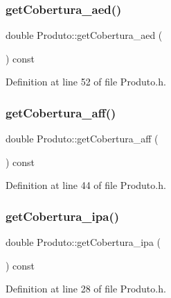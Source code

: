 \subsubsection{\texorpdfstring{get\+Cobertura\+\_\+aed()}{getCobertura\_aed()}}
{\footnotesize\ttfamily double Produto\+::get\+Cobertura\+\_\+aed (\begin{DoxyParamCaption}{ }\end{DoxyParamCaption}) const\hspace{0.3cm}{\ttfamily [inline]}}



Definition at line 52 of file Produto.\+h.

\hypertarget{class_produto_a9acf053a9b38ac53acca9e5dc33fa772}{}\label{class_produto_a9acf053a9b38ac53acca9e5dc33fa772} 
\subsubsection{\texorpdfstring{get\+Cobertura\+\_\+aff()}{getCobertura\_aff()}}
{\footnotesize\ttfamily double Produto\+::get\+Cobertura\+\_\+aff (\begin{DoxyParamCaption}{ }\end{DoxyParamCaption}) const\hspace{0.3cm}{\ttfamily [inline]}}



Definition at line 44 of file Produto.\+h.

\hypertarget{class_produto_a7fb03a7eb1d2a682ee87909217c3fb10}{}\label{class_produto_a7fb03a7eb1d2a682ee87909217c3fb10} 
\subsubsection{\texorpdfstring{get\+Cobertura\+\_\+ipa()}{getCobertura\_ipa()}}
{\footnotesize\ttfamily double Produto\+::get\+Cobertura\+\_\+ipa (\begin{DoxyParamCaption}{ }\end{DoxyParamCaption}) const\hspace{0.3cm}{\ttfamily [inline]}}



Definition at line 28 of file Produto.\+h.

